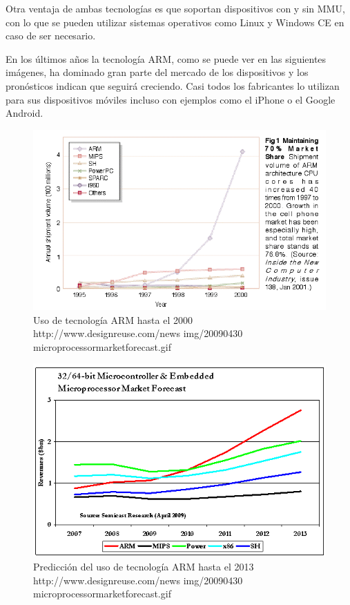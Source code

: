 Otra ventaja de ambas tecnologías es que soportan dispositivos con
y sin MMU, con lo que se pueden utilizar sistemas operativos como Linux
y Windows CE en caso de ser necesario.

En los últimos años la tecnología \ac{ARM}, como se puede ver en
las siguientes imágenes, ha dominado gran parte del mercado de los
dispositivos y los pronósticos indican que seguirá creciendo. Casi
todos los fabricantes lo utilizan para sus dispositivos móviles incluso
con ejemplos como el iPhone o el Google Android.

%
\begin{figure}
\includegraphics[scale=0.5]{img/tablaarm1}

\caption{Uso de tecnología ARM hasta el 2000{\scriptsize }\protect \\
{\scriptsize http://www.designreuse.com/news img/20090430 microprocessormarketforecast.gif}}



\end{figure}


{\scriptsize{} }%
\begin{figure}
\includegraphics[scale=0.5]{img/tablaarm2}

{\scriptsize \caption{Predicción del uso de tecnología ARM hasta el 2013\protect \\
{\scriptsize http://www.designreuse.com/news img/20090430 microprocessormarketforecast.gif }}
}{\scriptsize \par}


\end{figure}


